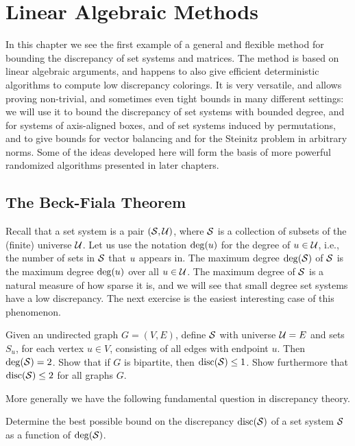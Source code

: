 \chapter{Linear Algebraic Methods}
\label{ch:linalg}

In this chapter we see the first example of a general and flexible
method for bounding the discrepancy of set systems and matrices. The
method is based on linear algebraic arguments, and happens to also
give efficient deterministic algorithms to compute low discrepancy
colorings. It is very versatile, and allows proving non-trivial, and
sometimes even tight bounds in many different settings: we will use it
to bound the discrepancy of set systems with bounded degree, and for systems of
axis-aligned boxes, and of set systems induced by permutations, and to
give bounds for vector balancing and for the Steinitz problem in
arbitrary norms. Some of the ideas developed here will form the basis of
more powerful randomized algorithms presented in later chapters.

\section{The Beck-Fiala Theorem}

Recall that a set system is a pair \((\mathcal{S},\mathcal{U})\), where $\mathcal{S}$ is a
collection of subsets of the (finite) universe $\mathcal{U}$. Let us use the notation
\(\operatorname{deg}(u)\) for the degree of \(u \in \mathcal{U}\), i.e., the number
of sets in \(\mathcal{S}\) that \(u\) appears in. The maximum degree
\(\operatorname{deg}(\mathcal{S})\) of \(\mathcal{S}\) is the maximum degree \(\operatorname{deg}(u)\) over all
\(u \in \mathcal{U}\). The maximum degree of $\mathcal{S}$ is a natural measure
of how sparse it is, and we will see that small degree set systems
have a low discrepancy. The next exercise is the easiest interesting
case of this phenomenon.

\begin{exercise}\label{ex:ch2-bf-graphs}
  Given an undirected graph $G = (V,E)$, define $\mathcal{S}$ with universe $\mathcal{U}=E$ and  sets $S_u$,
  for each vertex $u \in V$, consisting of all edges with endpoint
  $u$. Then $\operatorname{deg}(\mathcal{S}) = 2$. Show that if $G$ is
  bipartite, then $\operatorname{disc}(\mathcal{S}) \le 1$. Show furthermore that $\operatorname{disc}(\mathcal{S})
  \le 2$ for all graphs $G$.
\end{exercise}

More generally we have the following fundamental question in
discrepancy theory.
\begin{problem}
  Determine the best possible  bound on the discrepancy \(\operatorname{disc}(\mathcal{S})\)
  of a set system $\mathcal{S}$ as a function of \(\operatorname{deg}(\mathcal{S})\).
\end{problem}


